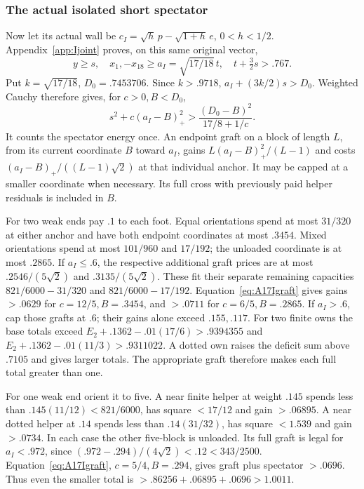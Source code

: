 \documentclass[11pt]{article}
\theoremstyle{definition}
\theoremstyle{remark}
\begin{document}
\subsubsection{The actual isolated short spectator}
Now let its actual wall be
\(c_I=\sqrt h\,p-\sqrt{1+h}\,e\), \(0<h<1/2\).
Appendix~\ref{app:Ijoint} proves, on this same original vector,
\[
 y\ge s,\quad x_1,-x_{18}\ge a_I=\sqrt{17/18}\,t,
 \quad t+\tfrac32s>.767.
\]
Put \(k=\sqrt{17/18}\), \(D_0=.7453706\). Since \(k>.9718\),
\(a_I+(3k/2)s>D_0\). Weighted Cauchy therefore gives, for
\(c>0,B<D_0\),
\begin{equation}\label{eq:A17Igraft}
 s^2+c(a_I-B)_+^2>{\frac{(D_0-B)^2}{17/8+1/c}}.
\end{equation}
It counts the spectator energy once. An endpoint graft on a block
of length \(L\), from its current coordinate \(B\) toward \(a_I\),
gains \(L(a_I-B)_+^2/(L-1)\) and costs
\((a_I-B)_+/((L-1)\sqrt2)\) at that individual anchor.
It may be capped at a smaller coordinate when necessary. Its full
cross with previously paid helper residuals is included in \(B\).

For two weak ends pay \(.1\) to each foot. Equal orientations
spend at most \(31/320\) at either anchor and have both endpoint
coordinates at most \(.3454\). Mixed orientations spend at most
\(101/960\) and \(17/192\); the unloaded coordinate is at most
\(.2865\). If \(a_I\le.6\), the respective additional graft
prices are at most \(.2546/(5\sqrt2)\) and
\(.3135/(5\sqrt2)\). These fit their separate remaining capacities
\(821/6000-31/320\) and \(821/6000-17/192\).
Equation~\eqref{eq:A17Igraft} gives gains \(>.0629\) for
\(c=12/5,B=.3454\), and \(>.0711\) for
\(c=6/5,B=.2865\). If \(a_I>.6\), cap those grafts at
\(.6\); their gains alone exceed \(.155,.117\).
For two finite owns the base totals exceed
\(E_2+.1362-.01(17/6)>.9394355\) and
\(E_2+.1362-.01(11/3)>.9311022\). A dotted own raises the
deficit sum above \(.7105\) and gives larger totals. The appropriate
graft therefore makes each full total greater than one.

For one weak end orient it to five. A near finite helper at weight
\(.145\) spends less than \(.145(11/12)<821/6000\), has square
\(<17/12\) and gain \(>.06895\). A near dotted helper at
\(.14\) spends less than \(.14(31/32)\), has square \(<1.539\)
and gain \(>.0734\). In each case the other five-block is unloaded.
Its full graft is legal for \(a_I<.972\), since
\((.972-.294)/(4\sqrt2)<.12<343/2500\).
Equation~\eqref{eq:A17Igraft}, \(c=5/4,B=.294\), gives
graft plus spectator \(>.0696\). Thus even the smaller total
is \(>.86256+.06895+.0696>1.0011\).
\end{document}
